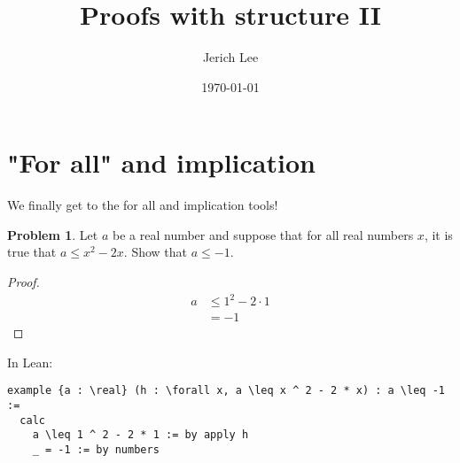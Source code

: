 \documentclass[12pt]{article}
\title{Proofs with structure II}
\author{Jerich Lee}
\date{\today}
\theoremstyle{definition} %
\newtheorem{problem}{Problem}
\theoremstyle{plain} %
\begin{document}
\maketitle
\section{"For all" and implication}
We finally get to the for all and implication tools!
\vspace{.5cm} 
\begin{problem}
    Let \(a\) be a real number and suppose that for all real numbers \(x\), it is true that \(a\leq x^{2}-2x\). Show that \(a\leq  -1\).   
\end{problem}
   \begin{proof}
    \begin{align}
        a&\leq 1^{2}-2\cdot 1 \\[10pt] 
        &= -1
    \end{align}
   \end{proof} 
   In Lean:
\begin{lstlisting}
example {a : \real} (h : \forall x, a \leq x ^ 2 - 2 * x) : a \leq -1 :=
  calc
    a \leq 1 ^ 2 - 2 * 1 := by apply h
    _ = -1 := by numbers
\end{lstlisting}
\end{document}
